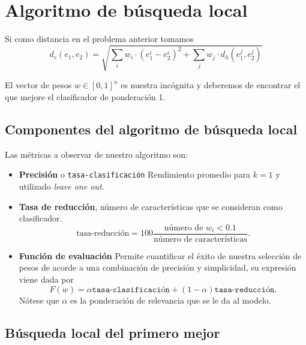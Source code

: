 \section{Algoritmo de búsqueda local}  

Si como distancia en el problema anterior tomamos 
\begin{equation}
    d_e(e_1, e_2)
     = 
     \sqrt{
         \sum_i
             w_i \cdot (e^i_1 - e^i_2)^2  
        +
        \sum_j w_j \cdot d_h(e_1^j, e_2^j)
         }
\end{equation}

El vector de pesos $w \in [0,1]^n$ es nuestra incógnita
y deberemos de encontrar el que mejore el clasificador de ponderación 1.

\subsection{Componentes del algoritmo de búsqueda local}  

Las métricas a observar de nuestro algoritmo son: 

\begin{itemize}
    \item \textbf{Precisión} o \texttt{tasa-clasificación} Rendimiento promedio para $k=1$ y utilizado \textit{leave one out}.
    \item \textbf{Tasa de reducción}, número de características que se consideran como clasificador. 
    \begin{equation}
        \text{tasa-reducción} 
        = 
        100
        \frac{\text{número de }w_i < 0.1}{\text{número de características}}.
    \end{equation}
    \item \textbf{Función de evaluación} Permite cuantificar el éxito de nuestra selección de pesos de acorde a una  combinación de precisión y simplicidad, su expresión viene dada por 
    \begin{equation}
        F(w) = 
            \alpha \texttt{tasa-clasificación}
            +
            (1 - \alpha) \texttt{tasa-reducción}.
    \end{equation}
    Nótese que $\alpha$ es la ponderación de relevancia que se le da al modelo.
\end{itemize}

\subsection{Búsqueda local del primero mejor}  

